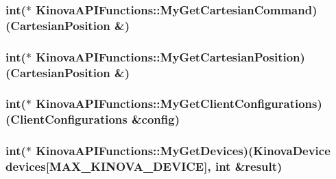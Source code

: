 \subsubsection[{\texorpdfstring{My\+Get\+Cartesian\+Command}{MyGetCartesianCommand}}]{\setlength{\rightskip}{0pt plus 5cm}int($\ast$ Kinova\+A\+P\+I\+Functions\+::\+My\+Get\+Cartesian\+Command)(Cartesian\+Position \&)}\hypertarget{classKinovaAPIFunctions_a1fc9b14b6b44eb77d659c10a69b5c5cf}{}\label{classKinovaAPIFunctions_a1fc9b14b6b44eb77d659c10a69b5c5cf}
\subsubsection[{\texorpdfstring{My\+Get\+Cartesian\+Position}{MyGetCartesianPosition}}]{\setlength{\rightskip}{0pt plus 5cm}int($\ast$ Kinova\+A\+P\+I\+Functions\+::\+My\+Get\+Cartesian\+Position)(Cartesian\+Position \&)}\hypertarget{classKinovaAPIFunctions_ad63c60c0295983280170e0702f1d28b4}{}\label{classKinovaAPIFunctions_ad63c60c0295983280170e0702f1d28b4}
\subsubsection[{\texorpdfstring{My\+Get\+Client\+Configurations}{MyGetClientConfigurations}}]{\setlength{\rightskip}{0pt plus 5cm}int($\ast$ Kinova\+A\+P\+I\+Functions\+::\+My\+Get\+Client\+Configurations)(Client\+Configurations \&config)}\hypertarget{classKinovaAPIFunctions_a1120b6b1e21b325a35a5931699f90062}{}\label{classKinovaAPIFunctions_a1120b6b1e21b325a35a5931699f90062}
\subsubsection[{\texorpdfstring{My\+Get\+Devices}{MyGetDevices}}]{\setlength{\rightskip}{0pt plus 5cm}int($\ast$ Kinova\+A\+P\+I\+Functions\+::\+My\+Get\+Devices)(Kinova\+Device devices\mbox{[}M\+A\+X\+\_\+\+K\+I\+N\+O\+V\+A\+\_\+\+D\+E\+V\+I\+CE\mbox{]}, int \&result)}\hypertarget{classKinovaAPIFunctions_a9430806c9f3eee8318d7642e67771040}{}\label{classKinovaAPIFunctions_a9430806c9f3eee8318d7642e67771040}
